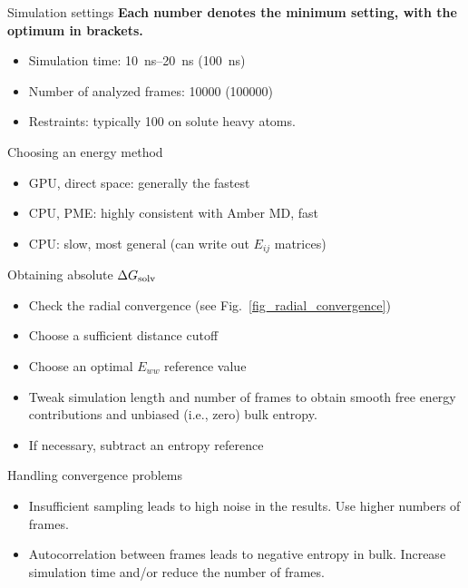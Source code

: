 \documentclass[9pt,tutorial]{livecoms}
\begin{document}
\begin{Checklists}[h]

\begin{checklist}{Simulation settings}
\textbf{Each number denotes the minimum setting, with the optimum in brackets.}
\begin{itemize}
	\item Simulation time: \SIrange{10}{20}{\nano\second} (\SI{100}{\nano\second})
	\item Number of analyzed frames: \num{10000} (\num{100000})
	\item Restraints: typically \SI{100}{\kcalPerMolASqr} on solute heavy atoms.
\end{itemize}
\end{checklist}

\begin{checklist}{Choosing an energy method}
\begin{itemize}
	\item GPU, direct space: generally the fastest
	\item CPU, PME: highly consistent with Amber MD, fast
	\item CPU: slow, most general (can write out $E_{ij}$ matrices)
\end{itemize}
\end{checklist}

\begin{checklist}{Obtaining absolute $\Delta G_\textup{solv}$}
\begin{itemize}
	\item Check the radial convergence (see Fig.~\ref{fig_radial_convergence})
	\item Choose a sufficient distance cutoff
	\item Choose an optimal $E_{ww}$ reference value
	\item Tweak simulation length and number of frames to obtain smooth free energy contributions and unbiased (i.e., zero) bulk entropy.
	\item If necessary, subtract an entropy reference
\end{itemize}
\end{checklist}

\begin{checklist}{Handling convergence problems}
\begin{itemize}
	\item Insufficient sampling leads to high noise in the results. Use higher numbers of frames.
	\item Autocorrelation between frames leads to negative entropy in bulk. Increase simulation time and/or reduce the number of frames.
\end{itemize}
\end{checklist}


\end{Checklists}
\end{document}

